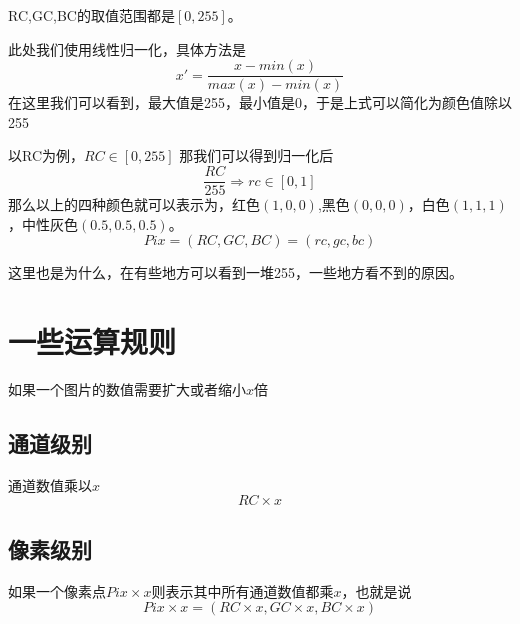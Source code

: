  RC,GC,BC的取值范围都是$[0,255]$。
\begin{notice}
\item 此处我们使用线性归一化，具体方法是$$x'=\dfrac{x-min(x)}{max(x)-min(x)}$$在这里我们可以看到，最大值是255，最小值是0，于是上式可以简化为颜色值除以255
\end{notice}
\indent 以RC为例，$RC\in[0,255]$\newline
\indent 那我们可以得到归一化后\begin{equation}\dfrac{RC}{255}\Rightarrow rc\in [0,1]\end{equation}
\indent 那么以上的四种颜色就可以表示为，红色$(1,0,0)$,黑色$(0,0,0)$，白色$(1,1,1)$，中性灰色$(0.5,0.5,0.5)$。
\begin{equation}
	Pix= (RC,GC,BC)=(rc,gc,bc)
\end{equation}
\begin{notice}
	\item 这里也是为什么，在有些地方可以看到一堆255，一些地方看不到的原因。
\end{notice}

\section{ 一些运算规则}
如果一个图片的数值需要扩大或者缩小$x$倍
\subsection{通道级别}
通道数值乘以$x$
\[RC\times x \]
\subsection{ 像素级别}
如果一个像素点$Pix\times x$则表示其中所有通道数值都乘$x$，也就是说
\begin{equation}
Pix\times x = (RC\times x,GC\times x,BC\times x)
\end{equation}
